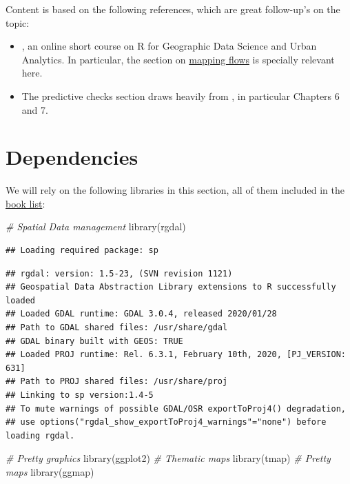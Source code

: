 \documentclass[
]{book}
\newenvironment{Shaded}{\begin{snugshade}}{\end{snugshade}}
\newcommand{\CommentTok}[1]{\textcolor[rgb]{0.56,0.35,0.01}{\textit{#1}}}
\newcommand{\FunctionTok}[1]{\textcolor[rgb]{0.00,0.00,0.00}{#1}}
\newcommand{\NormalTok}[1]{#1}
\providecommand{\tightlist}{%
  \setlength{\itemsep}{0pt}\setlength{\parskip}{0pt}}
\begin{document}
Content is based on the following references, which are great follow-up's on the topic:

\begin{itemize}
\tightlist
\item
  \citet{gds_ua17}, an online short course on R for Geographic Data Science and Urban Analytics. In particular, the section on \href{https://github.com/alexsingleton/GDS_UA_2017/tree/master/Mapping_Flows}{mapping flows} is specially relevant here.
\item
  The predictive checks section draws heavily from \citet{gelman2006data}, in particular Chapters 6 and 7.
\end{itemize}

\hypertarget{dependencies-2}{%
\section{Dependencies}\label{dependencies-2}}

We will rely on the following libraries in this section, all of them included in the \protect\hyperlink{Dependency-list}{book list}:

\begin{Shaded}
\begin{Highlighting}[]
\CommentTok{\# Spatial Data management}
\FunctionTok{library}\NormalTok{(rgdal)}
\end{Highlighting}
\end{Shaded}

\begin{verbatim}
## Loading required package: sp
\end{verbatim}

\begin{verbatim}
## rgdal: version: 1.5-23, (SVN revision 1121)
## Geospatial Data Abstraction Library extensions to R successfully loaded
## Loaded GDAL runtime: GDAL 3.0.4, released 2020/01/28
## Path to GDAL shared files: /usr/share/gdal
## GDAL binary built with GEOS: TRUE 
## Loaded PROJ runtime: Rel. 6.3.1, February 10th, 2020, [PJ_VERSION: 631]
## Path to PROJ shared files: /usr/share/proj
## Linking to sp version:1.4-5
## To mute warnings of possible GDAL/OSR exportToProj4() degradation,
## use options("rgdal_show_exportToProj4_warnings"="none") before loading rgdal.
\end{verbatim}

\begin{Shaded}
\begin{Highlighting}[]
\CommentTok{\# Pretty graphics}
\FunctionTok{library}\NormalTok{(ggplot2)}
\CommentTok{\# Thematic maps}
\FunctionTok{library}\NormalTok{(tmap)}
\CommentTok{\# Pretty maps}
\FunctionTok{library}\NormalTok{(ggmap)}
\end{Highlighting}
\end{Shaded}
\end{document}
